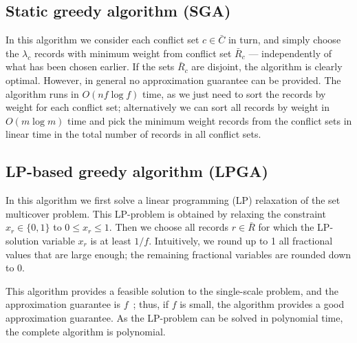 \subsection{Static greedy algorithm (SGA)}
\label{sec:algorithms:sga}

In this algorithm we consider each conflict set $c \in \bar{C}$ in turn, and simply choose the $\lambda_c$ records with minimum weight from conflict set $\bar{R}_c$ --- independently of what has been chosen earlier. If the sets $\bar{R}_c$ are disjoint, the algorithm is clearly optimal. However, in general no approximation guarantee can be provided. The algorithm runs in $O(n f \log f)$ time, as we just need to sort the records by weight for each conflict set; alternatively we can sort all records by weight in $O(m \log m)$ time and pick the minimum weight records from the conflict sets in linear time in the total number of records in all conflict sets.


\subsection{LP-based greedy algorithm (LPGA)}
\label{sec:algorithms:lpga}

In this algorithm we first solve a linear programming (LP) relaxation of the set multicover problem. This LP-problem is obtained by relaxing the constraint $x_r \in \{0, 1\}$ to $0 \leq x_r \leq 1$. Then we choose all records $r \in \bar{R}$ for which the LP-solution variable $x_r$ is at least $1 / f$. Intuitively, we round up to 1 all fractional values that are large enough; the remaining fractional variables are rounded down to 0. 

This algorithm provides a feasible solution to the single-scale problem, and the approximation guarantee is $f$~\cite{vazirani2001approximation}; thus, if $f$ is small, the algorithm provides a good approximation guarantee. As the LP-problem can be solved in polynomial time, the complete algorithm is polynomial.




